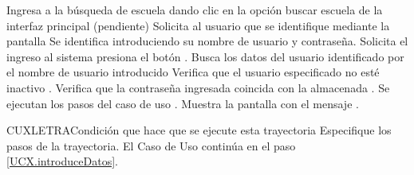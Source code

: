\begin{UCtrayectoria}
	\UCpaso[\UCactor] Ingresa a la búsqueda de escuela dando clic en la opción buscar escuela de la interfaz principal (pendiente)
	\UCpaso Solicita al usuario que se identifique mediante la pantalla 
	\UCpaso[\UCactor] \label{UCX.introduceDatos} Se identifica introduciendo su nombre de usuario y contraseña.
	\UCpaso[\UCactor] Solicita el ingreso al sistema presiona el botón .
	\UCpaso Busca los datos del usuario identificado por el nombre de usuario introducido 
	\UCpaso Verifica que el usuario especificado no esté inactivo  .
	\UCpaso Verifica que la contraseña ingresada coincida con la almacenada .
	\UCpaso[] Se ejecutan los pasos del caso de uso .
	\UCpaso Muestra la pantalla  con el mensaje .
\end{UCtrayectoria}


\begin{UCtrayectoriaA}{CUX}{LETRA}{Condición que hace que se ejecute esta trayectoria}
	\UCpaso Especifique los pasos  de la trayectoria.
	\UCpaso[] El Caso de Uso continúa en el paso \ref{UCX.introduceDatos}.
\end{UCtrayectoriaA}


